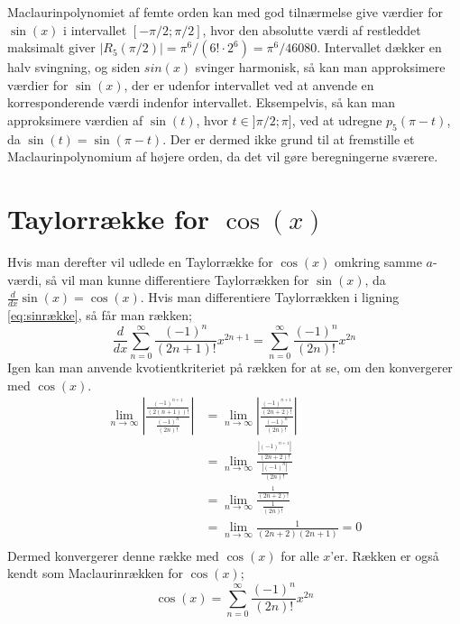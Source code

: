Maclaurinpolynomiet af femte orden kan med god tilnærmelse give værdier for $\sin(x)$ i intervallet $[-\pi /2; \pi /2]$, hvor den absolutte værdi af restleddet maksimalt giver $\left\lvert R_5(\pi/2) \right\lvert = \pi^6/{(6! \cdot 2^6)} = \pi^6/{46080}$. Intervallet dækker en halv svingning, og siden $sin(x)$ svinger harmonisk, så kan man approksimere værdier for $\sin(x)$, der er udenfor intervallet ved at anvende en korresponderende værdi indenfor intervallet. Eksempelvis, så kan man approksimere værdien af $\sin(t)$, hvor $t \in ]\pi/2;\pi]$, ved at udregne $p_5(\pi-t)$, da $\sin(t) = \sin(\pi-t)$. Der er dermed ikke grund til at fremstille et Maclaurinpolynomium af højere orden, da det vil gøre beregningerne sværere.
\section{Taylorrække for $\cos(x)$}
Hvis man derefter vil udlede en Taylorrække for $\cos(x)$ omkring samme $a$-værdi, så vil man kunne differentiere Taylorrækken for $\sin(x)$, da $\frac{d}{dx}\sin(x)=\cos(x)$. Hvis man differentiere Taylorrækken i ligning \ref{eq:sinrække}, så får man rækken;
\[
\frac{d}{dx} \sum_{n=0}^{\infty} \frac{(-1)^n}{(2n+1)!}x^{2n+1}
=
\sum_{n=0}^{\infty} \frac{(-1)^n}{(2n)!}x^{2n}
\]
Igen kan man anvende kvotientkriteriet på rækken for at se, om den konvergerer med $\cos(x)$.
\begin{align*}
\lim\limits_{n \to \infty}
\left\lvert
\frac{\frac{(-1)^{n+1}}{(2(n+1))!}}
{\frac{(-1)^n}{(2n)!}} 
\right\lvert
&=
\lim\limits_{n \to \infty}
\left\lvert
\frac{\frac{(-1)^{n+1}}{(2n+2)!}}
{\frac{(-1)^n}{(2n)!}}
\right\lvert 
\\
&=
\lim\limits_{n \to \infty}
\frac{\frac{\left\lvert (-1)^{n+1} \right\lvert }{(2n+2)!}}
{\frac{\left\lvert (-1)^n \right\lvert }{(2n)!}}
\\
&=
\lim\limits_{n \to \infty}
\frac{\frac{1}{(2n+2)!}}
{\frac{1}{(2n)!} }
\\
&=
\lim\limits_{n \to \infty}
\frac{1}{(2n+2)(2n+1)}
=0 \\
\end{align*}
Dermed konvergerer denne række med $\cos(x)$ for alle $x$'er. Rækken er også kendt som Maclaurinrækken for $\cos(x)$;
\begin{equation}\label{eq:cosrække}
\cos(x)=\sum_{n=0}^{\infty} \frac{(-1)^n}{(2n)!}x^{2n}
\end{equation}
